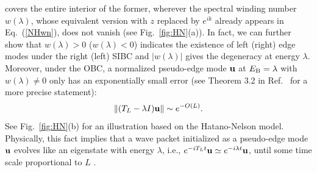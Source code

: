 \documentclass{tADP2e}
\theoremstyle{plain}
\theoremstyle{plain}
\theoremstyle{definition}
\begin{document}
covers the entire interior of the former, %
wherever the spectral winding number $w(\lambda)$, whose equivalent version with $z$ replaced by $e^{ik}$ already appears in Eq.~(\ref{NHwn}), does not vanish (see Fig.~\ref{fig:HN}(a)). In fact, we can further show that $w(\lambda)>0$ ($w(\lambda)<0$) indicates the existence of left (right) edge modes under the right (left) SIBC and $|w(\lambda)|$ gives the degeneracy at energy $\lambda$. Moreover, under the OBC, a normalized pseudo-edge mode $\bold{u}$ %
at $E_{\rm B}=\lambda$ with $w(\lambda)\neq0$ only has an exponentially small error (see Theorem 3.2 in Ref.~\cite{Reichel1992} for a more precise statement):
\begin{equation}
\|(T_L-\lambda I)\bold{u}\|\sim e^{-O(L)}.
\label{mTLS}
\end{equation}
See Fig.~\ref{fig:HN}(b) for an illustration based on the Hatano-Nelson model. Physically, this fact implies that a wave packet initialized as a pseudo-edge mode $\bold{u}$ 
evolves like an eigenstate with energy $\lambda$, i.e., $e^{-iT_Lt}\bold{u}\simeq e^{-i\lambda t}\bold{u}$, until some time scale proportional to $L$ 
\cite{ZG18}.
\end{document}
